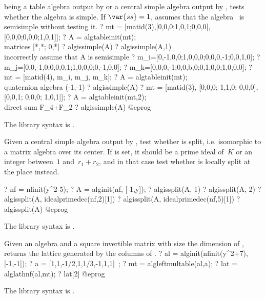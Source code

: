 \label{se:algissimple}
 being a table algebra output by  or a central
simple algebra output by , tests whether the algebra  is
simple. If $\var{ss}=1$, assumes that the algebra~ is semisimple
without testing it.
\bprog
? mt = [matid(3),[0,0,0;1,0,1;0,0,0],[0,0,0;0,0,0;1,0,1]];
? A = algtableinit(mt); \\ matrices [*,*; 0,*]
? algissimple(A)
? algissimple(A,1) \\ incorrectly assume that A is semisimple
? m_i=[0,-1,0,0;1,0,0,0;0,0,0,-1;0,0,1,0];
? m_j=[0,0,-1,0;0,0,0,1;1,0,0,0;0,-1,0,0];
? m_k=[0,0,0,-1;0,0,b,0;0,1,0,0;1,0,0,0];
? mt = [matid(4), m_i, m_j, m_k];
? A = algtableinit(mt); \\ quaternion algebra (-1,-1)
? algissimple(A)
? mt = [matid(3), [0,0,0; 1,1,0; 0,0,0], [0,0,1; 0,0,0; 1,0,1]];
? A = algtableinit(mt,2); \\ direct sum F_4+F_2
? algissimple(A)
@eprog

The library syntax is .

\label{se:algissplit}
Given a central simple algebra  output by , test
whether  is split, i.e. isomorphic to a matrix algebra over its center.
If  is set, it should be a prime ideal of~$K$ or an integer between~$1$
and~$r_1+r_2$, and in that case test whether  is locally split at the
place  instead.

\bprog
? nf = nfinit(y^2-5);
? A = alginit(nf, [-1,y]);
? algissplit(A, 1)
? algissplit(A, 2)
? algissplit(A, idealprimedec(nf,2)[1])
? algissplit(A, idealprimedec(nf,5)[1])
? algissplit(A)
@eprog

The library syntax is .

\label{se:alglathnf}
Given an algebra  and a square invertible matrix  with size
the dimension of , returns the lattice generated by the columns of
.
\bprog
? al = alginit(nfinit(y^2+7), [-1,-1]);
? a = [1,1,-1/2,1,1/3,-1,1,1]~;
? mt = algleftmultable(al,a);
? lat = alglathnf(al,mt);
? lat[2]
@eprog

The library syntax is .

